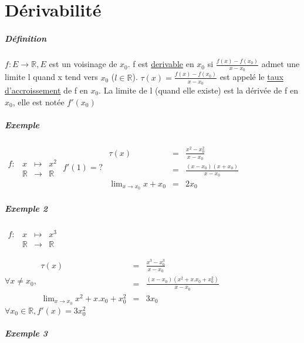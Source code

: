 \chapter{Dérivabilité}
\paragraph{Définition}
$f:E \rightarrow \mathbb{R}, E$ est un voisinage de $x_0$.
f est \ul{derivable} en $x_0$ si $\frac{f(x)-f(x_0)}{x-x_0}$ admet une limite l quand x tend vers $x_0$ ($l \in \mathbb{R}$).
$\tau (x) = \frac{f(x)-f(x_0)}{x-x_0}$ est appelé le \ul{taux d'accroissement} de f en $x_0$. La limite de l (quand elle existe) est la dérivée de f en $x_0$, elle est notée $f'(x_0)$

\paragraph{Exemple} $
\begin{array}{rcll}
	f:&x&\mapsto &x^2 \\
	& \mathbb{R} &\rightarrow &\mathbb{R}
\end{array}$ $f'(1) =  ?$      $\begin{array}{rcl}
								\tau (x) & = & \frac{x^2 - x_0^2}{x-x_0} \\
										&=& \frac{(x-x_0)(x+x_0)}{x-x_0} \\
										\lim_{x \to x_0} x+x_0 &=& 2x_0 
								\end{array} $

\paragraph{Exemple 2} 
$
\begin{array}{rcll}
	f:&x&\mapsto &x^3 \\
	& \mathbb{R} &\rightarrow &\mathbb{R} 
\end{array}$

$\forall x \neq x_0, \begin{array}{rcl}
\tau (x) &=& \frac{x^3 - x_0^3}{x - x_0} \\
 &=& \frac{(x-x_0)(x^2+x.x_0+x_0^2)}{x-x_0}\\
\lim_{x\to x_0} x^2 + x.x_0+x_0^2 &=& 3x_0 
\end{array}$
~\\
$\forall x_0 \in \mathbb{R}, f'(x) = 3x_0^2$

\paragraph{Exemple 3}

